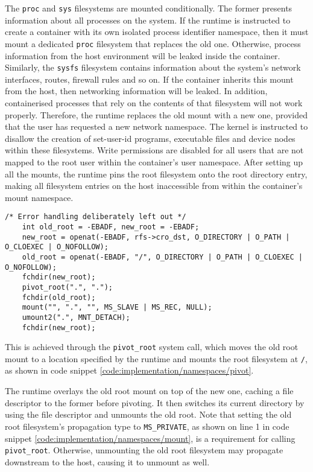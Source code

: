 The \verb|proc| and \verb|sys| filesystems are mounted conditionally. The former presents information
about all processes on the system. If the runtime is instructed to create a container with 
its own isolated process identifier namespace, then it must mount a dedicated \verb|proc|
filesystem that replaces the old one. Otherwise, process information from the host environment 
will be leaked inside the container. Similarly, the \verb|sysfs| filesystem contains information 
about the system's network interfaces, routes, firewall rules and so on. If the container inherits 
this mount from the host, then networking information will be leaked. In addition, containerised 
processes that rely on the contents of that filesystem will not work properly. Therefore, 
the runtime replaces the old mount with a new one, provided that the user has requested a 
new network namespace. The kernel is instructed to disallow the creation of set-user-id programs,
executable files and device nodes within these filesystems. Write permissions are disabled 
for all users that are not mapped to the root user within the container's user namespace. 
After setting up all the mounts, the runtime pins the root filesystem onto the 
root directory entry, making all filesystem entries on the host inaccessible from within the container's mount namespace.
\begin{lstlisting}[style=c-code-snippets, label={code:implementation/namespaces/pivot}, caption={Swap the old root filesystem with a new one}]
    /* Error handling deliberately left out */
    int old_root = -EBADF, new_root = -EBADF;
    new_root = openat(-EBADF, rfs->cro_dst, O_DIRECTORY | O_PATH | O_CLOEXEC | O_NOFOLLOW);
    old_root = openat(-EBADF, "/", O_DIRECTORY | O_PATH | O_CLOEXEC | O_NOFOLLOW);
    fchdir(new_root);
    pivot_root(".", ".");
    fchdir(old_root);
    mount("", ".", "", MS_SLAVE | MS_REC, NULL);
    umount2(".", MNT_DETACH);
    fchdir(new_root);
\end{lstlisting}
This is achieved through the \verb|pivot_root| system call, which moves 
the old root mount to a location specified by the runtime and mounts the root filesystem at \verb|/|,
as shown in code snippet \ref{code:implementation/namespaces/pivot}.

The runtime overlays the old root mount on top of the new one, caching a file descriptor to the former 
before pivoting. It then switches its current directory by using the file descriptor and unmounts
the old root. 
Note that setting 
the old root filesystem's propagation type to \verb|MS_PRIVATE|, as shown on line 1 in code snippet 
\ref{code:implementation/namespaces/mount}, is a requirement for calling \verb|pivot_root|.
Otherwise, unmounting the old root filesystem may propagate downstream to the host, causing it to 
unmount as well.

